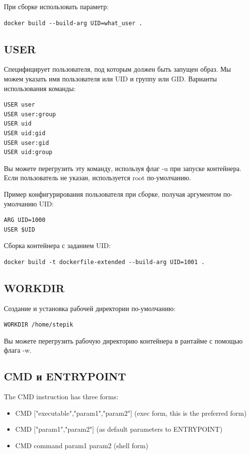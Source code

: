 При сборке использовать параметр:
\begin{lstlisting}
docker build --build-arg UID=what_user .
\end{lstlisting}

\subsection{USER}

Специфицирует пользователя, под которым должен быть запущен образ. Мы можем указать имя пользователя или UID и группу или GID. Варианты использования команды:
\begin{lstlisting}
USER user
USER user:group
USER uid
USER uid:gid
USER user:gid
USER uid:group
\end{lstlisting}
Вы можете перегрузить эту команду, используя флаг -u при запуске контейнера. Если пользователь не указан, используется root по-умолчанию.

Пример конфигурирования пользователя при сборке, получая аргументом по-умолчанию UID: 
\begin{lstlisting}
ARG UID=1000
USER $UID
\end{lstlisting}

Сборка контейнера с заданием UID:
\begin{lstlisting}
docker build -t dockerfile-extended --build-arg UID=1001 .
\end{lstlisting}

\subsection{WORKDIR}

Создание и установка рабочей директории по-умолчанию:
\begin{lstlisting}
WORKDIR /home/stepik
\end{lstlisting}
Вы можете перегрузить рабочую директорию контейнера в рантайме с помощью флага -w.

\subsection{CMD и ENTRYPOINT}

The CMD instruction has three forms:
\begin{itemize}
\item CMD ["executable","param1","param2"] (exec form, this is the preferred form)
\item CMD ["param1","param2"] (as default parameters to ENTRYPOINT)
\item CMD command param1 param2 (shell form)
\end{itemize}

